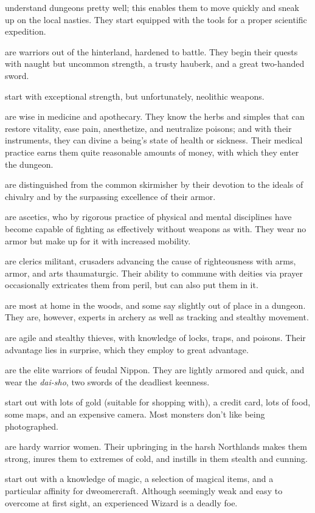 %
\blist{}
\item[\bb{Archeologists}]%
understand dungeons pretty well; this enables them
to move quickly and sneak up on the local nasties.  They start equipped
with the tools for a proper scientific expedition.
%
\item[\bb{Barbarians}]%
are warriors out of the hinterland, hardened to battle.
They begin their quests with naught but uncommon strength, a trusty hauberk,
and a great two-handed sword.
%
\item[\bb{Cavemen {\rm and} Cavewomen}]
start with exceptional strength, but unfortunately, neolithic weapons.
%
\item[\bb{Healers}]%
are wise in medicine and apothecary.  They know the
herbs and simples that can restore vitality, ease pain, anesthetize,
and neutralize
poisons; and with their instruments, they can divine a being's state
of health or sickness.  Their medical practice earns them quite reasonable
amounts of money, with which they enter the dungeon.
%
\item[\bb{Knights}]%
are distinguished from the common skirmisher by their
devotion to the ideals of chivalry and by the surpassing excellence of
their armor.
%
\item[\bb{Monks}]%
are ascetics, who by rigorous practice of physical and mental
disciplines have become capable of fighting as effectively without weapons
as with.  They wear no armor but make up for it with increased mobility.
%
\item[\bb{Priests {\rm and} Priestesses}]%
are clerics militant, crusaders
advancing the cause of righteousness with arms, armor, and arts
thaumaturgic.  Their ability to commune with deities via prayer
occasionally extricates them from peril, but can also put them in it.
%
\item[\bb{Rangers}]%
are most at home in the woods, and some say slightly out
of place in a dungeon.  They are, however, experts in archery as well
as tracking and stealthy movement.
%
\item[\bb{Rogues}]%
are agile and stealthy thieves, with knowledge of locks,
traps, and poisons.  Their advantage lies in surprise, which they employ
to great advantage.
%
\item[\bb{Samurai}]%
are the elite warriors of feudal Nippon.  They are lightly
armored and quick, and wear the %
{\it dai-sho}, two swords of the deadliest
keenness.
%
\item[\bb{Tourists}]%
start out with lots of gold (suitable for shopping with),
a credit card, lots of food, some maps, and an expensive camera.  Most
monsters don't like being photographed.
%
\item[\bb{Valkyries}]%
are hardy warrior women.  Their upbringing in the harsh
Northlands makes them strong, inures them to extremes of cold, and instills
in them stealth and cunning.
%
\item[\bb{Wizards}]%
start out with a knowledge of magic, a selection of magical
items, and a particular affinity for dweomercraft.  Although seemingly weak
and easy to overcome at first sight, an experienced Wizard is a deadly foe.
\elist

